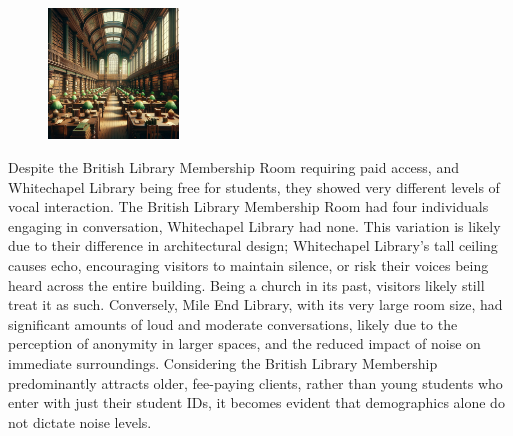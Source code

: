 \documentclass{novel}
\begin{document}
\begin{figure} 
\vspace{-\intextsep}
    \includegraphics[width=0.31\textwidth]{resources/whitechapel.jpg}
    \vspace{-20pt} %
\end{figure}
Despite the British Library Membership Room requiring paid access, and Whitechapel Library being free for students, they showed very different levels of vocal interaction. The British Library Membership Room had four individuals engaging in conversation, Whitechapel Library had none. This variation is likely due to their difference in architectural design; Whitechapel Library's tall ceiling causes echo, encouraging visitors to maintain silence, or risk their voices being heard across the entire building. Being a church in its past, visitors likely still treat it as such. Conversely, Mile End Library, with its very large room size, had significant amounts of loud and moderate conversations, likely due to the perception of anonymity in larger spaces, and the reduced impact of noise on immediate surroundings. Considering the British Library Membership predominantly attracts older, fee-paying clients, rather than young students who enter with just their student IDs, it becomes evident that demographics alone do not dictate noise levels.
\end{document}

